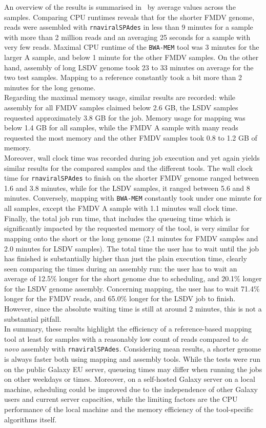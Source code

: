 An overview of the results is summarised in~ by average values across the samples. Comparing CPU runtimes reveals that for the shorter \ac{FMDV} genome, reads were assembled with \texttt{rnaviralSPAdes} in less than 9 minutes for a sample with more than 2 million reads and an averaging 25 seconds for a sample with very few reads. Maximal CPU runtime of the \texttt{BWA-MEM} tool was 3 minutes for the larger A sample, and below 1 minute for the other \ac{FMDV} samples. On the other hand, assembly of long \ac{LSDV} genome took 23 to 33 minutes on average for the two test samples. Mapping to a reference constantly took a bit more than 2 minutes for the long genome.\\
Regarding the maximal memory usage, similar results are recorded: while assembly for all \ac{FMDV} samples claimed below 2.6 GB, the \ac{LSDV} samples requested approximately 3.8 GB for the job. Memory usage for mapping was below 1.4 GB for all samples, while the \ac{FMDV} A sample with many reads requested the most memory and the other \ac{FMDV} samples took 0.8 to 1.2 GB of memory.\\
Moreover, wall clock time was recorded during job execution and yet again yields similar results for the compared samples and the different tools. The wall clock time for \texttt{rnaviralSPAdes} to finish on the shorter \ac{FMDV} genome ranged between 1.6 and 3.8 minutes, while for the \ac{LSDV} samples, it ranged between 5.6 and 8 minutes. Conversely, mapping with \texttt{BWA-MEM} constantly took under one minute for all samples, except the \ac{FMDV} A sample with 1.1 minutes wall clock time.\\
Finally, the total job run time, that includes the queueing time which is significantly impacted by the requested memory of the tool, is very similar for mapping onto the short or the long genome (2.1 minutes for \ac{FMDV} samples and 2.0 minutes for \ac{LSDV} samples). The total time the user has to wait until the job has finished is substantially higher than just the plain execution time, clearly seen comparing the times during an assembly run: the user has to wait an average of 12.5\% longer for the short genome due to scheduling, and 20.1\% longer for the \ac{LSDV} genome assembly. Concerning mapping, the user has to wait 71.4\% longer for the \ac{FMDV} reads, and 65.0\% longer for the \ac{LSDV} job to finish. However, since the absolute waiting time is still at around 2 minutes, this is not a substantial pitfall.\\
In summary, these results highlight the efficiency of a reference-based mapping tool at least for samples with a reasonably low count of reads compared to \textit{de novo} assembly with \texttt{rnaviralSPAdes}. Considering mean results, a shorter genome is always faster both using mapping and assembly tools. While the tests were run on the public Galaxy EU server, queueing times may differ when running the jobs on other weekdays or times. Moreover, on a self-hosted Galaxy server on a local machine, scheduling could be improved due to the independence of other Galaxy users and current server capacities, while the limiting factors are the CPU performance of the local machine and the memory efficiency of the tool-specific algorithms itself.
